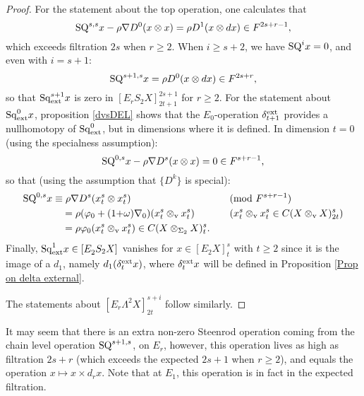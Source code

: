 \documentclass[11pt]{amsart} \renewcommand{\baselinestretch}{1.4}
\theoremstyle{plain}
\newtheorem{prop}[thm]{Proposition}
\theoremstyle{definition}
\let\oldphi\phi
\let\phi\varphi
\renewcommand{\to}{\longrightarrow}
\newcommand{\twist}{\omega}
\newcommand{\Nabla}{\nabla}
\newcommand{\Sq}{\mathrm{Sq}}
\newcommand{\Edownup}[5]{[E_{#1}^{#2}#3]^{#4}_{#5}}
\newcommand{\dver}{_\mathrm{v}}
\renewcommand{\mapsto}{\longmapsto}
\begin{document}
\begin{second quadrant homotopy sseq operations}
\begin{proof}
For the statement about the top operation, one calculates that
\[\textup{SQ}^{s,s}x-\rho\Nabla D^0(x\otimes x)=\rho D^{1}(x\otimes dx)\in F^{2s+r-1},\] which exceeds filtration $2s$ when $r\geq2$.
When $i\geq s+2$, we have $\textup{SQ}^{i}x=0$, and even with $i=s+1$:
\[\textup{SQ}^{s+1,s}x=\rho D^{0}(x\otimes dx)\in F^{2s+r},\]
so that $\Sq^{s+1}_\textup{ext}x$ is zero in $\Edownup{r}{}{S_2X}{2s+1}{2t+1}$ for $r\geq2$.
For the statement about $\Sq_\textup{ext}^0x$, proposition \ref{dvsDEL} shows that the $E_0$-operation $\delta_{t+1}^\textup{ext}$ provides a nullhomotopy of $\Sq_\textup{ext}^0$, but in dimensions where it is defined. In dimension $t=0$ (using the specialness assumption):
\[\textup{SQ}^{0,s}x-\rho\Nabla D^s(x\otimes x)=0 \in F^{s+r-1},\]
so that (using the assumption that $\{D^k\}$ is special):
\begin{alignat*}{2}
\textup{SQ}^{0,s}x
&\equiv
\rho\Nabla D^s(x^s_t\otimes x^s_t)&&\textup{(mod $F^{s+r-1}$)}%
\\
&\quad =
\rho(\oldphi_0+(1{+}\twist)\Nabla_0)(x^s_t\otimes\dver x^s_t)%
&\quad&\text{($x^s_t\otimes\dver x^s_t\in C(X\otimes\dver X)_{2t}^{s}$)}\\
&\quad =
\rho\oldphi_0(x^s_t\otimes\dver x^s_t)\in C(X\otimes_{\Sigma_2} X)_{t}^{s}.
\end{alignat*}
Finally, $\Sq^1_\textup{ext}x\in\Edownup{2}{}{S_2X}{}{}$ vanishes for $x\in \Edownup{2}{}{X}{s}{t}$ with $t\geq2$ since it is the image of a $d_1$, namely $d_1(\delta^\textup{ext}_tx)$, where $\delta_t^\textup{ext}x$ will be defined in Proposition \ref{Prop on delta external}.

The statements about $\Edownup{r}{}{\Lambda^2X}{s+i}{2t}$ follow similarly.
\end{proof}
It may seem that there is an extra non-zero Steenrod operation coming from the chain level operation $\textup{SQ}^{s+1,s}$, on $E_r$, however, this operation lives as high as filtration $2s+r$ (which exceeds the expected $2s+1$ when $r\geq2$), and equals the operation $x\mapsto x\times d_rx$. Note that at $E_1$, this operation is in fact in the expected filtration.


\end{second quadrant homotopy sseq operations}
\end{document}
